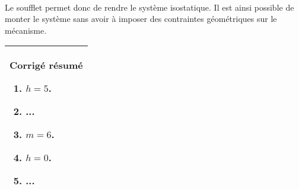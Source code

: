 \begin{multicols}{2}
\ifprof
\begin{corrige} ~\\
Le soufflet permet donc de rendre le système isostatique. Il est ainsi possible de monter le système sans avoir à imposer des contraintes géométriques sur le mécanisme. 
\end{corrige}
\else
\fi


\ifprof
\else
\begin{center}
\begin{tabular}{|p{.95\linewidth}|}
\hline
\textbf{Corrigé résumé}
\begin{enumerate}
\item $h=5$.
\item ...
\item $m=6$.
\item $h=0$.
\item ...
\end{enumerate} \\
\hline
\end{tabular}
\end{center}
\fi

\end{multicols}
